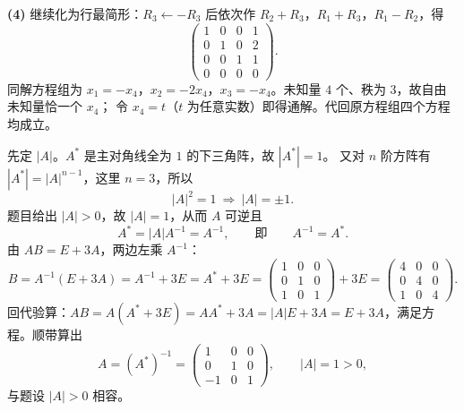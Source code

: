 \begin{solution}
\textbf{(4)} 继续化为行最简形：$R_3\leftarrow-R_3$ 后依次作 $R_2+R_3$，$R_1+R_3$，$R_1-R_2$，得
\[
\begin{pmatrix}1&0&0&1\\0&1&0&2\\0&0&1&1\\0&0&0&0\end{pmatrix}.
\]
同解方程组为 $x_1=-x_4$，$x_2=-2x_4$，$x_3=-x_4$。未知量 $4$ 个、秩为 $3$，故自由未知量恰一个 $x_4$；
令 $x_4=t$（$t$ 为任意实数）即得通解。代回原方程组四个方程均成立。
\end{solution}

\begin{solution}
先定 $|A|$。$A^{*}$ 是主对角线全为 $1$ 的下三角阵，故 $|A^{*}|=1$。
又对 $n$ 阶方阵有 $|A^{*}|=|A|^{n-1}$，这里 $n=3$，所以
\[
|A|^{2}=1\ \Longrightarrow\ |A|=\pm1 .
\]
题目给出 $|A|>0$，故 $|A|=1$，从而 $A$ 可逆且
\[
A^{*}=|A|A^{-1}=A^{-1},\qquad\text{即}\qquad A^{-1}=A^{*}.
\]
由 $AB=E+3A$，两边左乘 $A^{-1}$：
\[
B=A^{-1}(E+3A)=A^{-1}+3E=A^{*}+3E
=\begin{pmatrix}1&0&0\\0&1&0\\1&0&1\end{pmatrix}+3E
=\begin{pmatrix}4&0&0\\0&4&0\\1&0&4\end{pmatrix}.
\]
回代验算：$AB=A(A^{*}+3E)=AA^{*}+3A=|A|E+3A=E+3A$，满足方程。顺带算出
\[
A=(A^{*})^{-1}=\begin{pmatrix}1&0&0\\0&1&0\\-1&0&1\end{pmatrix},\qquad |A|=1>0,
\]
与题设 $|A|>0$ 相容。
\end{solution}

